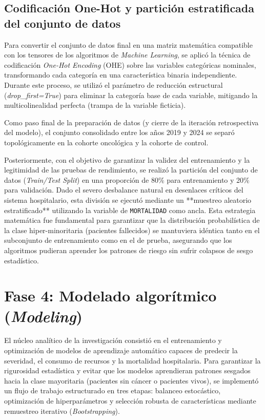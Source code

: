 \subsection{Codificación One-Hot y partición estratificada del conjunto de datos}
Para convertir el conjunto de datos final en una matriz matemática compatible con los tensores de los algoritmos de \textit{Machine Learning}, se aplicó la técnica de codificación \textit{One-Hot Encoding} (OHE) sobre las variables categóricas nominales, transformando cada categoría en una característica binaria independiente. Durante este proceso, se utilizó el parámetro de reducción estructural (\textit{drop\_first=True}) para eliminar la categoría base de cada variable, mitigando la multicolinealidad perfecta (trampa de la variable ficticia).

Como paso final de la preparación de datos (y cierre de la iteración retrospectiva del modelo), el conjunto consolidado entre los años 2019 y 2024 se separó topológicamente en la cohorte oncológica y la cohorte de control. 

Posteriormente, con el objetivo de garantizar la validez del entrenamiento y la legitimidad de las pruebas de rendimiento, se realizó la partición del conjunto de datos (\textit{Train/Test Split}) en una proporción de 80\% para entrenamiento y 20\% para validación. Dado el severo desbalance natural en desenlaces críticos del sistema hospitalario, esta división se ejecutó mediante un **muestreo aleatorio estratificado** utilizando la variable de \texttt{MORTALIDAD} como ancla. Esta estrategia matemática fue fundamental para garantizar que la distribución probabilística de la clase hiper-minoritaria (pacientes fallecidos) se mantuviera idéntica tanto en el subconjunto de entrenamiento como en el de prueba, asegurando que los algoritmos pudieran aprender los patrones de riesgo sin sufrir colapsos de sesgo estadístico.


\section{Fase 4: Modelado algorítmico (\textit{Modeling})}
\label{sec:modelado}

El núcleo analítico de la investigación consistió en el entrenamiento y optimización de modelos de aprendizaje automático capaces de predecir la severidad, el consumo de recursos y la mortalidad hospitalaria. Para garantizar la rigurosidad estadística y evitar que los modelos aprendieran patrones sesgados hacia la clase mayoritaria (pacientes sin cáncer o pacientes vivos), se implementó un flujo de trabajo estructurado en tres etapas: balanceo estocástico, optimización de hiperparámetros y selección robusta de características mediante remuestreo iterativo (\textit{Bootstrapping}).


